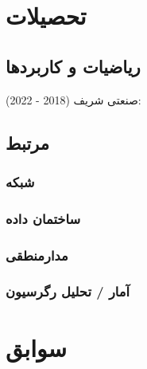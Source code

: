 \documentclass{article}
\begin{document}
\section{تحصیلات} %
\subsection{ریاضیات و کاربردها}
صنعتی شریف (2018 - 2022):
\subsection{مرتبط}
\subsubsection{شبکه}
\subsubsection{ساختمان داده}
\subsubsection{مدارمنطقی}
\subsubsection{آمار / تحلیل رگرسیون}
\section{سوابق}
\end{document}
